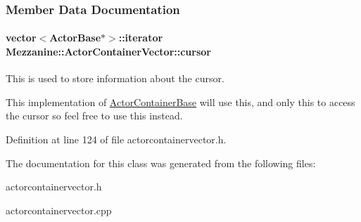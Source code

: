 \subsubsection{Member Data Documentation}
\hypertarget{classMezzanine_1_1ActorContainerVector_ac359dee117cfe4829c656f7599ea9092}{
\paragraph[{cursor}]{\setlength{\rightskip}{0pt plus 5cm}vector$<${\bf ActorBase}$\ast$$>$::iterator {\bf Mezzanine::ActorContainerVector::cursor}}\hfill}
\label{classMezzanine_1_1ActorContainerVector_ac359dee117cfe4829c656f7599ea9092}


This is used to store information about the cursor. 

This implementation of \hyperlink{classMezzanine_1_1ActorContainerBase}{ActorContainerBase} will use this, and only this to access the cursor so feel free to use this instead. 

Definition at line 124 of file actorcontainervector.h.



The documentation for this class was generated from the following files:\begin{DoxyCompactItemize}
\item 
actorcontainervector.h\item 
actorcontainervector.cpp\end{DoxyCompactItemize}
